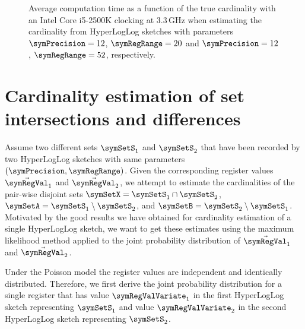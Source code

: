 \documentclass[a4paper]{scrartcl}
\begin{document}
\begin{figure}
\centering

\caption{Average computation time as a function of the true cardinality with an Intel Core i5-2500K clocking at 3.3\,GHz when estimating the cardinality from HyperLogLog sketches with parameters $\symPrecision=12$, $\symRegRange=20$ and $\symPrecision=12$, $\symRegRange=52$, respectively.}
\label{fig:avg_exec_time}
\end{figure}

\section{Cardinality estimation of set intersections and differences}
Assume two different sets $\symSetS_1$ and $\symSetS_2$ that have been recorded by two HyperLogLog sketches with same parameters $(\symPrecision,\symRegRange)$. Given the corresponding register values $\vec{\symRegVal}_1$ and
$\vec{\symRegVal}_2$, we attempt to estimate the cardinalities of the pair-wise disjoint sets $\symSetX = \symSetS_1\cap\symSetS_2$, $\symSetA = \symSetS_1\setminus\symSetS_2$, and $\symSetB = \symSetS_2\setminus\symSetS_1$. Motivated by the good results we have obtained for cardinality estimation of a single HyperLogLog sketch, we want to get these estimates using the maximum likelihood method applied to the joint probability distribution of $\vec{\symRegVal}_1$ and $\vec{\symRegVal}_2$.

Under the Poisson model the register values are independent and identically distributed. Therefore, we first derive the joint probability distribution for a single register that has value $\symRegValVariate_1$ in the first HyperLogLog sketch representing $\symSetS_1$ and value $\symRegValVariate_2$ in the second HyperLogLog sketch representing $\symSetS_2$. 
\end{document}
